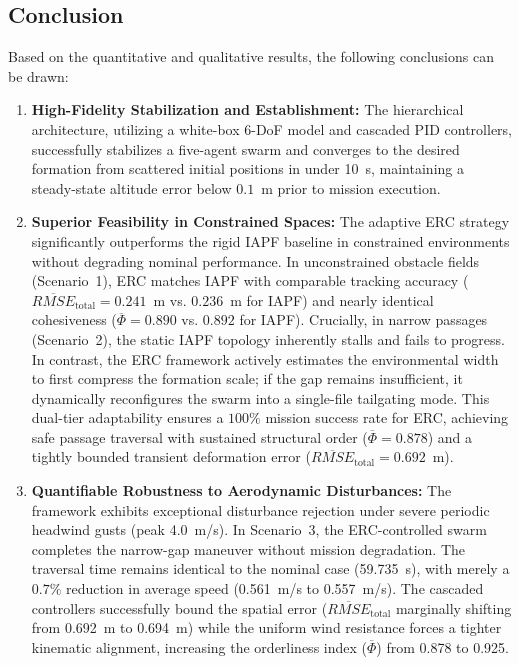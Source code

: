 \documentclass[pdflatex,sn-basic]{sn-jnl}%
\begin{document}
    \subsection{Conclusion}
        Based on the quantitative and qualitative results, the following conclusions can be drawn:

        \begin{enumerate}
            \item \textbf{High-Fidelity Stabilization and Establishment:} The hierarchical architecture, utilizing a white-box 6-DoF model and cascaded PID controllers, successfully stabilizes a five-agent swarm and converges to the desired formation from scattered initial positions in under 10~s, maintaining a steady-state altitude error below $0.1$~m prior to mission execution.

            \item \textbf{Superior Feasibility in Constrained Spaces:} The adaptive ERC strategy significantly outperforms the rigid IAPF baseline in constrained environments without degrading nominal performance. In unconstrained obstacle fields (Scenario~1), ERC matches IAPF with comparable tracking accuracy ($\overline{RMSE}_{\text{total}} = 0.241$~m vs. $0.236$~m for IAPF) and nearly identical cohesiveness ($\overline{\Phi} = 0.890$ vs. $0.892$ for IAPF). Crucially, in narrow passages (Scenario~2), the static IAPF topology inherently stalls and fails to progress. In contrast, the ERC framework actively estimates the environmental width to first compress the formation scale; if the gap remains insufficient, it dynamically reconfigures the swarm into a single-file tailgating mode. This dual-tier adaptability ensures a $100\%$ mission success rate for ERC, achieving safe passage traversal with sustained structural order ($\overline{\Phi} = 0.878$) and a tightly bounded transient deformation error ($\overline{RMSE}_{\text{total}} = 0.692$~m).

            \item \textbf{Quantifiable Robustness to Aerodynamic Disturbances:} The framework exhibits exceptional disturbance rejection under severe periodic headwind gusts (peak 4.0~m/s). In Scenario~3, the ERC-controlled swarm completes the narrow-gap maneuver without mission degradation. The traversal time remains identical to the nominal case (59.735~s), with merely a $0.7\%$ reduction in average speed (0.561~m/s to 0.557~m/s). The cascaded controllers successfully bound the spatial error ($\overline{RMSE}_{\text{total}}$ marginally shifting from 0.692~m to 0.694~m) while the uniform wind resistance forces a tighter kinematic alignment, increasing the orderliness index ($\overline{\Phi}$) from 0.878 to 0.925.


\end{enumerate}
\end{document}
